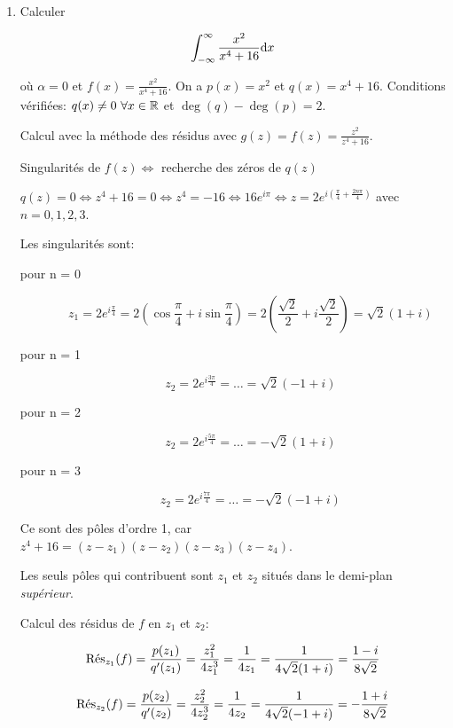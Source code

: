 \begin{enumerate}
\item

\begin{example}[1]
Calculer

\[ \int_{-\infty}^\infty \frac{x^2}{x^4 + 16} \dx \]

où $\alpha = 0$ et $f(x) = \frac{x^2}{x^4 + 16}$.
On a $p(x) = x^2$ et $q(x) = x^4 + 16$.
Conditions vérifiées: $q(x) \neq 0 \ \forall x \in \R$ et $\deg(q) - \deg(p) = 2$.

Calcul avec la méthode des résidus avec $g(z) = f(z) = \frac{z^2}{z^4 + 16}$.

Singularités de $f(z) \iff$ recherche des zéros de $q(z)$

$q(z) = 0 \iff z^4 + 16 = 0 \iff z^4 = -16 \iff 16 e^{i\pi} \iff z = 2 e^{i\left(\frac{\pi}{4} + \frac{2n\pi}{4}\right)}$ avec $n = 0,1,2,3$.

Les singularités sont:

\begin{description}
    \item[pour n = 0]
        \[ z_1 = 2 e^{i\frac{\pi}{4}}
        = 2 \left( \cos \frac{\pi}{4} + i \sin \frac{\pi}{4}\right)
        = 2 \left( \frac{\sqrt{2}}{2} + i \frac{\sqrt{2}}{2} \right) = \sqrt{2} (1 + i)\]

    \item[pour n = 1]
        \[ z_2 = 2 e^{i\frac{3\pi}{4}} = \ldots = \sqrt{2} (-1 + i) \]

    \item[pour n = 2]
        \[ z_2 = 2 e^{i\frac{5\pi}{4}} = \ldots = - \sqrt{2} (1 + i) \]

    \item[pour n = 3]
        \[ z_2 = 2 e^{i\frac{7\pi}{4}} = \ldots = - \sqrt{2} (-1 + i) \]
\end{description}

Ce sont des pôles d'ordre 1, car $z^4 + 16 = (z - z_1) (z - z_2) (z - z_3) (z - z_4)$.

Les seuls pôles qui contribuent sont $z_1$ et $z_2$ situés dans le demi-plan \textit{supérieur}.

Calcul des résidus de $f$ en $z_1$ et $z_2$:

\[
    \Res_{z_1}(f) = \frac{p(z_1)}{q'(z_1)}
    = \frac{z_1^2}{4 z_1^3} = \frac{1}{4 z_1} = \frac{1}{4\sqrt{2}(1+i)} = \frac{1 - i}{8\sqrt{2}}
\]

\[
    \Res_{z_2}(f) = \frac{p(z_2)}{q'(z_2)}
    = \frac{z_2^2}{4 z_2^3} = \frac{1}{4 z_2} = \frac{1}{4\sqrt{2}(-1+i)} = - \frac{1 + i}{8\sqrt{2}}
\]


\end{example}
\end{enumerate}
